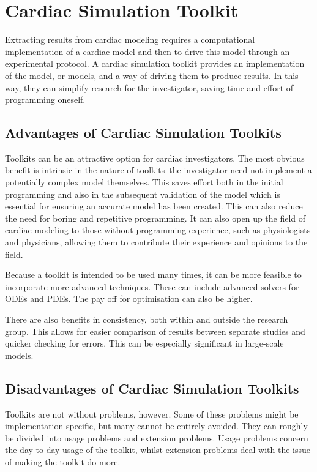 \section{Cardiac Simulation Toolkit}

Extracting results from cardiac modeling requires a computational implementation
of a cardiac model and then to drive this model through an experimental
protocol.
A cardiac simulation toolkit provides an implementation of the model, or models,
and a way of driving them to produce results.
In this way, they can simplify research for the investigator, saving time and
effort of programming oneself.


\subsection{Advantages of Cardiac Simulation Toolkits}

Toolkits can be an attractive option for cardiac investigators.
The most obvious benefit is intrinsic in the nature of toolkits--the
investigator need not implement a potentially complex model themselves.
This saves effort both in the initial programming and also in the subsequent
validation of the model which is essential for ensuring an accurate model has
been created.
This can also reduce the need for boring and repetitive programming.
It can also open up the field of cardiac modeling to those without programming
experience, such as physiologists and physicians, allowing them to contribute
their experience and opinions to the field.

Because a toolkit is intended to be used many times, it can be more feasible to
incorporate more advanced techniques.
These can include advanced solvers for ODEs and PDEs.
The pay off for optimisation can also be higher.

There are also benefits in consistency, both within and outside the research
group.
This allows for easier comparison of results between separate studies and
quicker checking for errors.
This can be especially significant in large-scale models.

\subsection{Disadvantages of Cardiac Simulation Toolkits}

Toolkits are not without problems, however.
Some of these problems might be implementation specific, but many cannot be
entirely avoided.
They can roughly be divided into usage problems and extension problems.
Usage problems concern the day-to-day usage of the toolkit, whilst extension
problems deal with the issue of making the toolkit do more.

